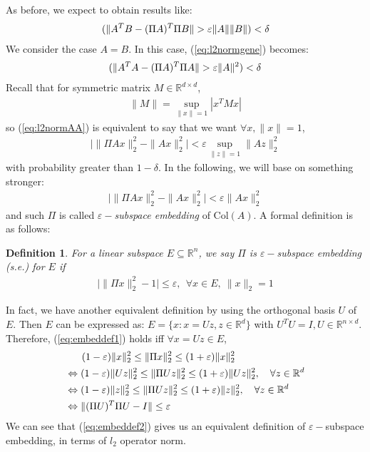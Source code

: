 \documentclass[11pt]{article}
\let\Pr\relax
\DeclareMathOperator*{\Pr}{\mathbb{P}}
\newcommand{\eps}{\varepsilon}
\newtheorem{definition}[theorem]{Definition}
\begin{document}
As before, we expect to obtain results like:
\begin{align}
\label{eq:l2normgene}
\Pr(\|A^TB-(\Pi A)^T\Pi B\|>\eps\|A\|\|B\|)<\delta
\end{align}
We consider the case $A=B$. In this case, (\ref{eq:l2normgene}) becomes:
\begin{align}
\label{eq:l2normAA}
\Pr(\|A^TA-(\Pi A)^T\Pi A\|>\eps\|A\|^2)<\delta
\end{align}
Recall that for symmetric matrix $M\in \mathbb{R}^{d\times d}$,
\begin{align*}
\|M\| = \sup_{\|x\|=1}|x^TMx|
\end{align*}
so (\ref{eq:l2normAA}) is equivalent to say that we want $\forall x, \|x\|=1$,
\begin{align*}
\big| \|\Pi A x\|_2^2 - \|Ax\|_2^2 \big| < \eps \sup_{\|z\|=1}\|Az\|_2^2
\end{align*}
with probability greater than $1-\delta$. In the following, we will base on something stronger:
\begin{align*}
\big| \|\Pi A x\|_2^2 - \|Ax\|_2^2 \big| < \eps \|Ax\|_2^2
\end{align*}
and such $\Pi$ is called \emph{$\eps-$subspace embedding} of $\text{Col}(A)$. A formal definition is as follows:
\begin{definition}
For a linear subspace $E\subseteq \mathbb{R}^n$, we say $\Pi$ is $\eps-$subspace embedding (s.e.) for $E$ if
\begin{align}
\label{eq:embeddef1}
\big|\|\Pi x\|_2^2-1\big|\leq \eps,~~\forall x \in E,~ \|x\|_2=1
\end{align}
\end{definition}
In fact, we have another equivalent definition by using the orthogonal basis $U$ of $E$. Then $E$ can be expressed as: $E=\{x: x=Uz,z\in \mathbb{R}^d\}$ with $U^TU=I,U\in\mathbb{R}^{n\times d}$. Therefore, (\ref{eq:embeddef1}) holds iff $\forall x=Uz\in E$,
\begin{align}
&~~~~~(1-\varepsilon)\|x\|_2^2 \leq \|\Pi x\|_2^2 \leq (1+\varepsilon)\|x\|_2^2\notag\\
&\Leftrightarrow (1-\varepsilon)\|Uz\|_2^2 \leq \|\Pi Uz\|_2^2 \leq (1+\varepsilon)\|Uz\|_2^2,~~~\forall z\in \mathbb{R}^d\notag\\
&\Leftrightarrow (1-\varepsilon)\|z\|_2^2 \leq \|\Pi U z\|_2^2 \leq (1+\varepsilon)\|z\|_2^2,~~~\forall z\in \mathbb{R}^d\notag\\
\label{eq:embeddef2}
&\Leftrightarrow \|(\Pi U)^T\Pi U-I\|\leq \eps
\end{align}
We can see that (\ref{eq:embeddef2}) gives us an equivalent definition of $\eps-$subspace embedding, in terms of $l_2$ operator norm.
\end{document}
